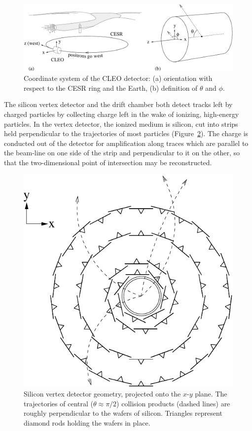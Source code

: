 \documentclass{cornell}
\begin{document}
\begin{figure}[p]
  \begin{center}
    \includegraphics[width=\linewidth]{newplots/coordinatesystem}
  \end{center}
  \caption[Coordinate system of the CLEO
  detector]{\label{coordinatesystem} Coordinate system of the CLEO
  detector: (a) orientation with respect to the CESR ring and the
  Earth, (b) definition of $\theta$ and $\phi$.}
\end{figure}

The silicon vertex detector and the drift chamber both detect tracks
left by charged particles by collecting charge left in the wake of
ionizing, high-energy particles.  In the vertex detector, the ionized
medium is silicon, cut into strips held perpendicular to the
trajectories of most particles (Figure~\ref{sidiagram}).  The charge
is conducted out of the detector for amplification along traces which
are parallel to the beam-line on one side of the strip and
perpendicular to it on the other, so that the two-dimensional point of
intersection may be reconstructed.

\begin{figure}[p]
  \begin{center}
    \includegraphics[width=0.5\linewidth]{plots/sidiagram}
  \end{center}
  \caption[Silicon vertex detector geometry]{\label{sidiagram} Silicon
  vertex detector geometry, projected onto the $x$-$y$ plane.  The
  trajectories of central ($\theta \approx \pi/2$) collision products
  (dashed lines) are roughly perpendicular to the wafers of silicon.
  Triangles represent diamond rods holding the wafers in place.}
\end{figure}
\end{document}
